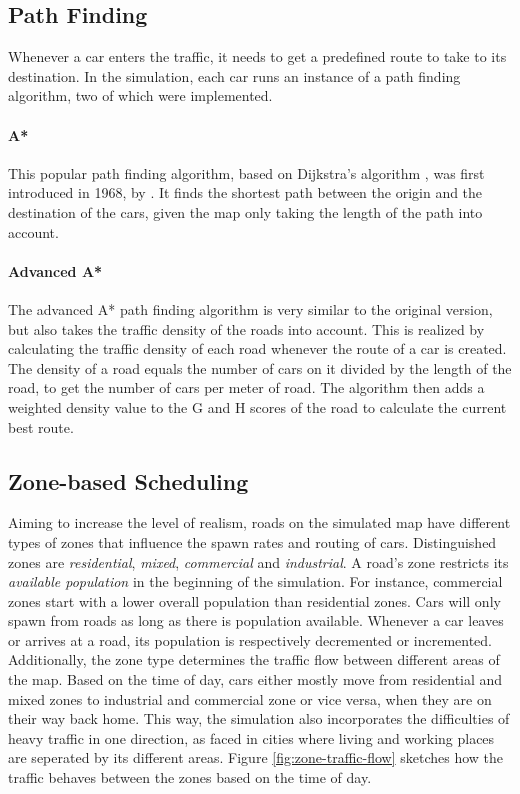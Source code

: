 \documentclass[10pt]{article}
\begin{document}
\subsection{Path Finding}
Whenever a car enters the traffic, it needs to get a predefined route to take to its destination. In the simulation, each car runs an instance of a path finding algorithm, two of which were implemented.

\paragraph{A*}
This popular path finding algorithm, based on Dijkstra’s algorithm \citep{dijkstra1959note}, was first introduced in 1968, by \citet{hart1968formal}. It finds the shortest path between the origin and the destination of the cars, given the map only taking the length of the path into account.

\paragraph{Advanced A*}
The advanced A* path finding algorithm is very similar to the original version, but also takes the traffic density of the roads into account. This is realized by calculating the traffic density of each road whenever the route of a car is created. The density of a road equals the number of cars on it divided by the length of the road, to get the number of cars per meter of road. The algorithm then adds a weighted density value to the G and H scores of the road to calculate the current best route.

\subsection{Zone-based Scheduling}
Aiming to increase the level of realism, roads on the simulated map have different types of zones that influence the spawn rates and routing of cars. Distinguished zones are \textit{residential}, \textit{mixed}, \textit{commercial} and \textit{industrial}. A road's zone restricts its \textit{available population} in the beginning of the simulation. For instance, commercial zones start with a lower overall population than residential zones. Cars will only spawn from roads as long as there is population available. Whenever a car leaves or arrives at a road, its population is respectively decremented or incremented. Additionally, the zone type determines the traffic flow between different areas of the map. Based on the time of day, cars either mostly move from residential and mixed zones to industrial and commercial zone or vice versa, when they are on their way back home. This way, the simulation also incorporates the difficulties of heavy traffic in one direction, as faced in cities where living and working places are seperated by its different areas. Figure \ref{fig:zone-traffic-flow} sketches how the traffic behaves between the zones based on the time of day.
\end{document}
